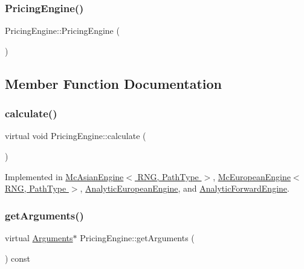 \subsubsection{\texorpdfstring{Pricing\+Engine()}{PricingEngine()}}
{\footnotesize\ttfamily Pricing\+Engine\+::\+Pricing\+Engine (\begin{DoxyParamCaption}{ }\end{DoxyParamCaption})\hspace{0.3cm}{\ttfamily [inline]}}



\subsection{Member Function Documentation}
\hypertarget{class_pricing_engine_a733511ffc3cf5e4dc1fbc2a39208d8bd}{}\label{class_pricing_engine_a733511ffc3cf5e4dc1fbc2a39208d8bd} 
\subsubsection{\texorpdfstring{calculate()}{calculate()}}
{\footnotesize\ttfamily virtual void Pricing\+Engine\+::calculate (\begin{DoxyParamCaption}{ }\end{DoxyParamCaption})\hspace{0.3cm}{\ttfamily [pure virtual]}}



Implemented in \hyperlink{class_mc_asian_engine_ac16f4259846f55dc6c02d0b628f34e63}{Mc\+Asian\+Engine$<$ R\+N\+G, Path\+Type $>$}, \hyperlink{class_mc_european_engine_ade20e53724dc0a0b103b211ee61a7c67}{Mc\+European\+Engine$<$ R\+N\+G, Path\+Type $>$}, \hyperlink{class_analytic_european_engine_adeda22c7b482779d7deaa17037195487}{Analytic\+European\+Engine}, and \hyperlink{class_analytic_forward_engine_a12d6791a13bf727d43ffcff9cb55b094}{Analytic\+Forward\+Engine}.

\hypertarget{class_pricing_engine_a399f4519f58b2ac1d108ce14d0058c97}{}\label{class_pricing_engine_a399f4519f58b2ac1d108ce14d0058c97} 
\subsubsection{\texorpdfstring{get\+Arguments()}{getArguments()}}
{\footnotesize\ttfamily virtual \hyperlink{class_pricing_engine_1_1_arguments}{Arguments}$\ast$ Pricing\+Engine\+::get\+Arguments (\begin{DoxyParamCaption}{ }\end{DoxyParamCaption}) const\hspace{0.3cm}{\ttfamily [pure virtual]}}



